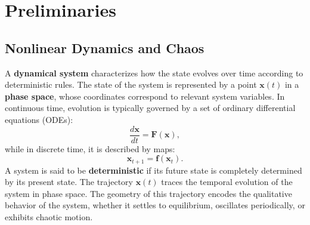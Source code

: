 \documentclass[a4paper,12pt]{article}
\begin{document}
    \section{Preliminaries}
    \label{sec:preliminaries}


    \subsection{Nonlinear Dynamics and Chaos}
    \label{subsec:nonlinear_dynamics}

    A \textbf{dynamical system} characterizes how the state evolves over time according to deterministic rules. The state of the system is represented by a point $\mathbf{x}(t)$ in a \textbf{phase space}, whose coordinates correspond to relevant system variables. In continuous time, evolution is typically governed by a set of ordinary differential equations (ODEs):
    \begin{equation}
        \frac{d\mathbf{x}}{dt} = \mathbf{F}(\mathbf{x}),
    \end{equation}
    while in discrete time, it is described by maps:
    \begin{equation}
        \mathbf{x}_{t+1} = \mathbf{f}(\mathbf{x}_t).
    \end{equation}
    A system is said to be \textbf{deterministic} if its future state is completely determined by its present state. The trajectory $\mathbf{x}(t)$ traces the temporal evolution of the system in phase space. The geometry of this trajectory encodes the qualitative behavior of the system, whether it settles to equilibrium, oscillates periodically, or exhibits chaotic motion. 

\end{document}
